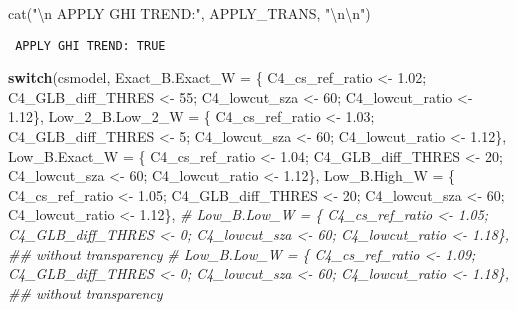 \documentclass[
  10pt,
  a4paper,oneside]{article}
\newenvironment{Shaded}{\begin{snugshade}}{\end{snugshade}}
\newcommand{\AttributeTok}[1]{\textcolor[rgb]{0.77,0.63,0.00}{#1}}
\newcommand{\CommentTok}[1]{\textcolor[rgb]{0.56,0.35,0.01}{\textit{#1}}}
\newcommand{\ControlFlowTok}[1]{\textcolor[rgb]{0.13,0.29,0.53}{\textbf{#1}}}
\newcommand{\DecValTok}[1]{\textcolor[rgb]{0.00,0.00,0.81}{#1}}
\newcommand{\FloatTok}[1]{\textcolor[rgb]{0.00,0.00,0.81}{#1}}
\newcommand{\FunctionTok}[1]{\textcolor[rgb]{0.00,0.00,0.00}{#1}}
\newcommand{\NormalTok}[1]{#1}
\newcommand{\OtherTok}[1]{\textcolor[rgb]{0.56,0.35,0.01}{#1}}
\newcommand{\SpecialCharTok}[1]{\textcolor[rgb]{0.00,0.00,0.00}{#1}}
\newcommand{\StringTok}[1]{\textcolor[rgb]{0.31,0.60,0.02}{#1}}
\begin{document}
\begin{Shaded}
\begin{Highlighting}[]
\FunctionTok{cat}\NormalTok{(}\StringTok{"}\SpecialCharTok{\textbackslash{}n}\StringTok{ APPLY GHI TREND:"}\NormalTok{, APPLY\_TRANS, }\StringTok{"}\SpecialCharTok{\textbackslash{}n\textbackslash{}n}\StringTok{"}\NormalTok{)}
\end{Highlighting}
\end{Shaded}

\begin{verbatim}
 APPLY GHI TREND: TRUE 
\end{verbatim}

\begin{Shaded}
\begin{Highlighting}[]
\ControlFlowTok{switch}\NormalTok{(csmodel,}
       \AttributeTok{Exact\_B.Exact\_W =}\NormalTok{ \{ C4\_cs\_ref\_ratio }\OtherTok{\textless{}{-}} \FloatTok{1.02}\NormalTok{; C4\_GLB\_diff\_THRES }\OtherTok{\textless{}{-}} \DecValTok{55}\NormalTok{; C4\_lowcut\_sza }\OtherTok{\textless{}{-}} \DecValTok{60}\NormalTok{; C4\_lowcut\_ratio }\OtherTok{\textless{}{-}} \FloatTok{1.12}\NormalTok{\},}
       \AttributeTok{Low\_2\_B.Low\_2\_W =}\NormalTok{ \{ C4\_cs\_ref\_ratio }\OtherTok{\textless{}{-}} \FloatTok{1.03}\NormalTok{; C4\_GLB\_diff\_THRES }\OtherTok{\textless{}{-}}  \DecValTok{5}\NormalTok{; C4\_lowcut\_sza }\OtherTok{\textless{}{-}} \DecValTok{60}\NormalTok{; C4\_lowcut\_ratio }\OtherTok{\textless{}{-}} \FloatTok{1.12}\NormalTok{\},}
       \AttributeTok{Low\_B.Exact\_W   =}\NormalTok{ \{ C4\_cs\_ref\_ratio }\OtherTok{\textless{}{-}} \FloatTok{1.04}\NormalTok{; C4\_GLB\_diff\_THRES }\OtherTok{\textless{}{-}} \DecValTok{20}\NormalTok{; C4\_lowcut\_sza }\OtherTok{\textless{}{-}} \DecValTok{60}\NormalTok{; C4\_lowcut\_ratio }\OtherTok{\textless{}{-}} \FloatTok{1.12}\NormalTok{\},}
       \AttributeTok{Low\_B.High\_W    =}\NormalTok{ \{ C4\_cs\_ref\_ratio }\OtherTok{\textless{}{-}} \FloatTok{1.05}\NormalTok{; C4\_GLB\_diff\_THRES }\OtherTok{\textless{}{-}} \DecValTok{20}\NormalTok{; C4\_lowcut\_sza }\OtherTok{\textless{}{-}} \DecValTok{60}\NormalTok{; C4\_lowcut\_ratio }\OtherTok{\textless{}{-}} \FloatTok{1.12}\NormalTok{\},}
       \CommentTok{\# Low\_B.Low\_W     = \{ C4\_cs\_ref\_ratio \textless{}{-} 1.05; C4\_GLB\_diff\_THRES \textless{}{-}  0; C4\_lowcut\_sza \textless{}{-} 60; C4\_lowcut\_ratio \textless{}{-} 1.18\}, \#\# without transparency}
       \CommentTok{\# Low\_B.Low\_W     = \{ C4\_cs\_ref\_ratio \textless{}{-} 1.09; C4\_GLB\_diff\_THRES \textless{}{-}  0; C4\_lowcut\_sza \textless{}{-} 60; C4\_lowcut\_ratio \textless{}{-} 1.18\}, \#\# without transparency}

\end{Highlighting}
\end{Shaded}
\end{document}
